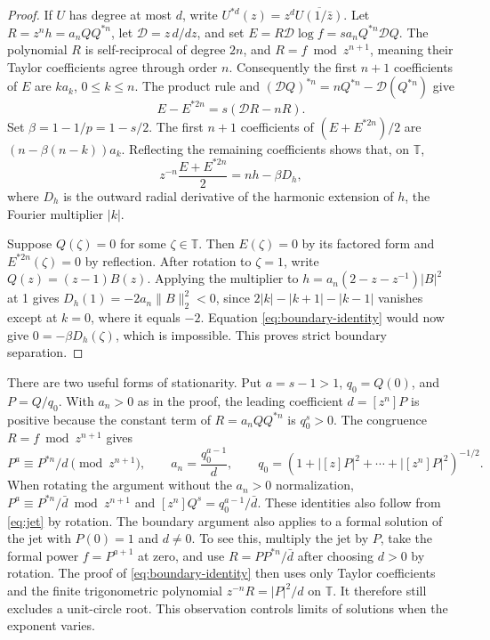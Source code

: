 \documentclass[11pt]{article}
\newcommand{\T}{\mathbb T}
\newcommand{\Dif}{\mathcal D}
\newcommand{\coef}[1]{[z^{#1}]}
\begin{document}
\begin{proof}
If \(U\) has degree at most \(d\), write \(U^{*d}(z)=
z^d\overline{U(1/\bar z)}\).
Let \(R=z^n h=a_n QQ^{*n}\), let \(\Dif=z\,d/dz\), and set
\(E=R\Dif\log f=s a_n Q^{*n}\Dif Q\).
The polynomial \(R\) is self-reciprocal of degree \(2n\), and
\(R=f\bmod z^{n+1}\), meaning their Taylor coefficients agree through
order \(n\). Consequently the first \(n+1\) coefficients of \(E\)
are \(k a_k\), \(0\le k\le n\). The product rule and
\((\Dif Q)^{*n}=nQ^{*n}-\Dif(Q^{*n})\) give
\[
 E-E^{*2n}=s(\Dif R-nR).
\]
Set \(\beta=1-1/p=1-s/2\). The first \(n+1\) coefficients of
\((E+E^{*2n})/2\) are \((n-\beta(n-k))a_k\).
Reflecting the remaining coefficients shows that, on \(\T\),
\begin{equation}\label{eq:boundary-identity}
 z^{-n}\frac{E+E^{*2n}}{2}=nh-\beta D_h,
\end{equation}
where \(D_h\) is the outward radial derivative of the harmonic
extension of \(h\), the Fourier multiplier \(|k|\).

Suppose \(Q(\zeta)=0\) for some \(\zeta\in\T\). Then \(E(\zeta)=0\)
by its factored form and \(E^{*2n}(\zeta)=0\) by reflection.
After rotation to \(\zeta=1\), write \(Q(z)=(z-1)B(z)\).
Applying the multiplier to
\(h=a_n(2-z-z^{-1})|B|^2\) at 1 gives
\(D_h(1)=-2a_n\|B\|_2^2<0\), since
\(2|k|-|k+1|-|k-1|\) vanishes except at \(k=0\), where it
equals \(-2\). Equation \eqref{eq:boundary-identity} would now give
\(0=-\beta D_h(\zeta)\), which is impossible. This proves strict
boundary separation.
\end{proof}

There are two useful forms of stationarity. Put \(a=s-1>1\),
\(q_0=Q(0)\), and \(P=Q/q_0\). With \(a_n>0\) as in the proof,
the leading coefficient \(d=\coef n P\) is positive because the
constant term of \(R=a_n QQ^{*n}\) is \(q_0^s>0\).
The congruence \(R=f\bmod z^{n+1}\) gives
\begin{equation}\label{eq:jet}
 P^a\equiv P^{*n}/d\pmod{z^{n+1}},\qquad
 a_n=\frac{q_0^{a-1}}{d},\qquad
 q_0=(1+|[z]P|^2+\cdots+|\coef nP|^2)^{-1/2}.
\end{equation}
When rotating the argument without the \(a_n>0\) normalization,
\(P^a\equiv P^{*n}/\bar d\bmod z^{n+1}\) and
\(\coef n Q^s=q_0^{a-1}/\bar d\). These identities also follow
from \eqref{eq:jet} by rotation.
The boundary argument also applies to a formal solution of the
jet with \(P(0)=1\) and \(d\ne0\). To see this, multiply the
jet by \(P\), take the formal power \(f=P^{a+1}\) at zero, and
use \(R=PP^{*n}/\bar d\) after choosing \(d>0\) by rotation.
The proof of \eqref{eq:boundary-identity} then uses only Taylor
coefficients and the finite trigonometric polynomial
\(z^{-n}R=|P|^2/d\) on \(\T\). It therefore still excludes a
unit-circle root. This observation controls limits of solutions
when the exponent varies.
\end{document}
